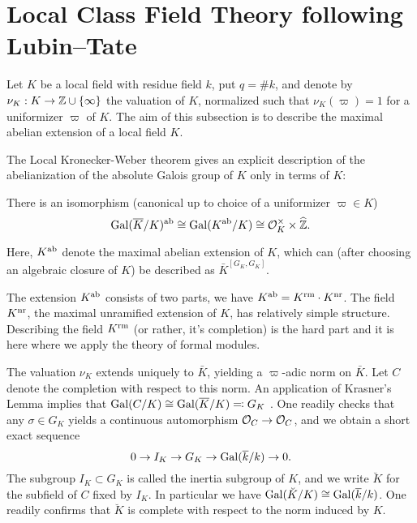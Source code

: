 \documentclass[../main.tex]{subfiles}
\begin{document}
\section{Local Class Field Theory following Lubin--Tate} %
\label{sec:Local Class Field Theory}
Let $K$ be a local field with residue field $k$, put $q = \# k$, and 
denote by $\nu_K: K \to \mathbb{Z} \cup \{\infty\}$ the valuation of $K$, normalized
such that $\nu_K(\varpi) = 1$ for a uniformizer $\varpi$ of $K$.
The aim of this subsection is to describe the maximal abelian extension of
a local field $K$.

The Local Kronecker-Weber theorem gives an explicit description of the
abelianization of the absolute Galois group of $K$ only in terms of $K$:

\begin{thm}\label{thm:localKW}
  There is an isomorphism (canonical up to choice of a uniformizer 
  $\varpi \in K$)
  \begin{equation*}
    \operatorname{Gal}(\overline K/K)^{\mathrm{ab}} \cong \operatorname{Gal}(K^{\mathrm{ab}}/K) \cong \mathcal{O}_K^\times
    \times \widehat {\mathbb{Z}}.
  \end{equation*}
\end{thm}
Here, $K^{\mathrm{ab}}$ denote the maximal abelian extension of $K$, which can (after choosing
an algebraic closure of $K$) be described as $\bar K^{[G_K, G_K]}$. 

The extension $K^{\mathrm{ab}}$ consists of two parts, we have 
$K^{\mathrm{ab}} = K^{\mathrm{rm}} \cdot K^{\mathrm{nr}}$. The field $K^{\mathrm{nr}}$, the maximal unramified extension
of $K$, has relatively simple structure. 
Describing the field $K^{\mathrm{rm}}$ (or rather, it's completion) is the hard part and
it is here where we apply the theory of formal modules.

The valuation $\nu_K$ extends uniquely to $\bar K$, yielding a
$\varpi$-adic norm on $\bar K$. Let $C$ denote the completion with respect to this
norm. An application of Krasner's Lemma implies that $\operatorname{Gal}(C/K) \cong \operatorname{Gal}(\overline
K/K) \eqqcolon G_K$
. One readily checks that any $\sigma \in G_K$ yields a 
continuous automorphism $\mathcal{O}_C \to \mathcal{O}_C$, and we obtain a short exact sequence 
\begin{equation*}
  0 \to I_K \to G_K \to \operatorname{Gal}(\overline k /k) \to 0.
\end{equation*}
The subgroup $I_K \subset G_K$ is called the inertia subgroup of $K$,
and we write $\breve K$ for the subfield of $C$ fixed by $I_K$. In particular
we have $\operatorname{Gal}(\breve K /K) \cong \operatorname{Gal}(\overline k /k)$. One readily confirms that 
$\breve K$ is complete with respect to the norm induced by $K$. 
\end{document}

